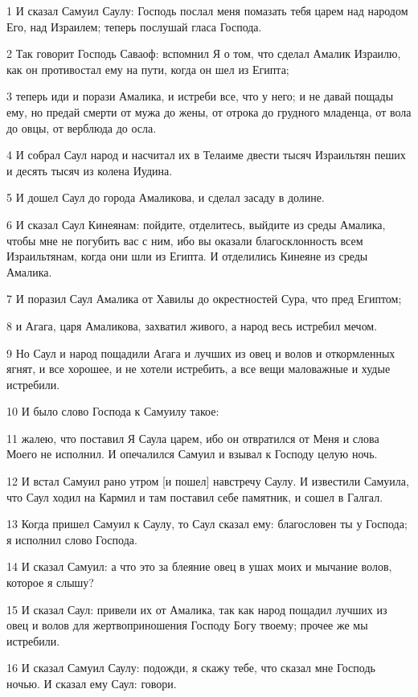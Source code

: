 \par 1 И сказал Самуил Саулу: Господь послал меня помазать тебя царем над народом Его, над Израилем; теперь послушай гласа Господа.
\par 2 Так говорит Господь Саваоф: вспомнил Я о том, что сделал Амалик Израилю, как он противостал ему на пути, когда он шел из Египта;
\par 3 теперь иди и порази Амалика, и истреби все, что у него; и не давай пощады ему, но предай смерти от мужа до жены, от отрока до грудного младенца, от вола до овцы, от верблюда до осла.
\par 4 И собрал Саул народ и насчитал их в Телаиме двести тысяч Израильтян пеших и десять тысяч из колена Иудина.
\par 5 И дошел Саул до города Амаликова, и сделал засаду в долине.
\par 6 И сказал Саул Кинеянам: пойдите, отделитесь, выйдите из среды Амалика, чтобы мне не погубить вас с ним, ибо вы оказали благосклонность всем Израильтянам, когда они шли из Египта. И отделились Кинеяне из среды Амалика.
\par 7 И поразил Саул Амалика от Хавилы до окрестностей Сура, что пред Египтом;
\par 8 и Агага, царя Амаликова, захватил живого, а народ весь истребил мечом.
\par 9 Но Саул и народ пощадили Агага и лучших из овец и волов и откормленных ягнят, и все хорошее, и не хотели истребить, а все вещи маловажные и худые истребили.
\par 10 И было слово Господа к Самуилу такое:
\par 11 жалею, что поставил Я Саула царем, ибо он отвратился от Меня и слова Моего не исполнил. И опечалился Самуил и взывал к Господу целую ночь.
\par 12 И встал Самуил рано утром [и пошел] навстречу Саулу. И известили Самуила, что Саул ходил на Кармил и там поставил себе памятник, и сошел в Галгал.
\par 13 Когда пришел Самуил к Саулу, то Саул сказал ему: благословен ты у Господа; я исполнил слово Господа.
\par 14 И сказал Самуил: а что это за блеяние овец в ушах моих и мычание волов, которое я слышу?
\par 15 И сказал Саул: привели их от Амалика, так как народ пощадил лучших из овец и волов для жертвоприношения Господу Богу твоему; прочее же мы истребили.
\par 16 И сказал Самуил Саулу: подожди, я скажу тебе, что сказал мне Господь ночью. И сказал ему Саул: говори.
